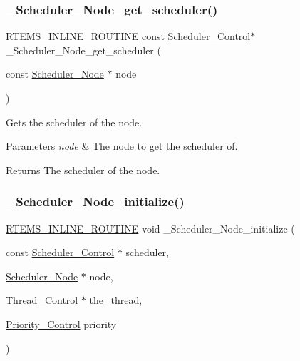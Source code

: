 \subsubsection{\texorpdfstring{\_Scheduler\_Node\_get\_scheduler()}{\_Scheduler\_Node\_get\_scheduler()}}
{\footnotesize\ttfamily \mbox{\hyperlink{group__RTEMSScoreBaseDefs_gac216239df231d5dbd15e3520b0b9313f}{R\+T\+E\+M\+S\+\_\+\+I\+N\+L\+I\+N\+E\+\_\+\+R\+O\+U\+T\+I\+NE}} const \mbox{\hyperlink{struct__Scheduler__Control}{Scheduler\+\_\+\+Control}}$\ast$ \+\_\+\+Scheduler\+\_\+\+Node\+\_\+get\+\_\+scheduler (\begin{DoxyParamCaption}\item[{const \mbox{\hyperlink{structScheduler__Node}{Scheduler\+\_\+\+Node}} $\ast$}]{node }\end{DoxyParamCaption})}



Gets the scheduler of the node. 


\begin{DoxyParams}{Parameters}
{\em node} & The node to get the scheduler of.\\
\hline
\end{DoxyParams}
\begin{DoxyReturn}{Returns}
The scheduler of the node. 
\end{DoxyReturn}
\mbox{\label{group__RTEMSScoreScheduler_ga6305be03088f2eda4f85c186a3bfd495}} 
\subsubsection{\texorpdfstring{\_Scheduler\_Node\_initialize()}{\_Scheduler\_Node\_initialize()}}
{\footnotesize\ttfamily \mbox{\hyperlink{group__RTEMSScoreBaseDefs_gac216239df231d5dbd15e3520b0b9313f}{R\+T\+E\+M\+S\+\_\+\+I\+N\+L\+I\+N\+E\+\_\+\+R\+O\+U\+T\+I\+NE}} void \+\_\+\+Scheduler\+\_\+\+Node\+\_\+initialize (\begin{DoxyParamCaption}\item[{const \mbox{\hyperlink{struct__Scheduler__Control}{Scheduler\+\_\+\+Control}} $\ast$}]{scheduler,  }\item[{\mbox{\hyperlink{structScheduler__Node}{Scheduler\+\_\+\+Node}} $\ast$}]{node,  }\item[{\mbox{\hyperlink{struct__Thread__Control}{Thread\+\_\+\+Control}} $\ast$}]{the\+\_\+thread,  }\item[{\mbox{\hyperlink{group__RTEMSScorePriority_ga59d02b58072d31a9a1cfe644557aefe2}{Priority\+\_\+\+Control}}}]{priority }\end{DoxyParamCaption})}



